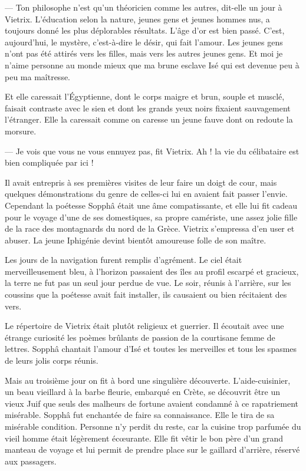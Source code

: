 \documentclass[a4paper, 11pt, oneside, polutonikogreek, french]{article}
\begin{document}
--- Ton philosophe n'est qu'un théoricien comme les autres, dit-elle un jour à Vietrix. L'éducation selon la nature, jeunes gens et jeunes hommes nus, a toujours donné les plus déplorables résultats. L'âge d'or est bien passé. C'est, aujourd'hui, le mystère, c'est-à-dire le désir, qui fait l'amour. Les jeunes gens n'ont pas été attirés vers les filles, mais vers les autres jeunes gens. Et moi je n'aime personne au monde mieux que ma brune esclave Isé qui est devenue peu à peu ma maîtresse.

Et elle caressait l'Égyptienne, dont le corps maigre et brun, souple et musclé, faisait contraste avec le sien et dont les grands yeux noirs fixaient sauvagement l'étranger. Elle la caressait comme on caresse un jeune fauve dont on redoute la morsure.

--- Je vois que vous ne vous ennuyez pas, fit Vietrix. Ah ! la vie du célibataire est bien compliquée par ici !

Il avait entrepris à ses premières visites de leur faire un doigt de cour, mais quelques démonstrations du genre de celles-ci lui en avaient fait passer l'envie. Cependant la poétesse Sopphâ était une âme compatissante, et elle lui fit cadeau pour le voyage d'une de ses domestiques, sa propre camériste, une assez jolie fille de la race des montagnards du nord de la Grèce. Vietrix s'empressa d'en user et abuser. La jeune Iphigénie devint bientôt amoureuse folle de son maître.

\bigskip
\centerline{\EightStarTaper}
\centerline{\EightStarTaper\EightStarTaper}
\bigskip

Les jours de la navigation furent remplis d'agrément. Le ciel était merveilleusement bleu, à l'horizon passaient des îles au profil escarpé et gracieux, la terre ne fut pas un seul jour perdue de vue. Le soir, réunis à l'arrière, sur les coussins que la poétesse avait fait installer, ils causaient ou bien récitaient des vers.

Le répertoire de Vietrix était plutôt religieux et guerrier. Il écoutait avec une étrange curiosité les poèmes brûlants de passion de la courtisane femme de lettres. Sopphâ chantait l'amour d'Isé et toutes les merveilles et tous les spasmes de leurs jolis corps réunis.

\bigskip
\centerline{\EightStarTaper}
\centerline{\EightStarTaper\EightStarTaper}
\bigskip

Mais au troisième jour on fit à bord une singulière découverte. L'aide-cuisinier, un beau vieillard à la barbe fleurie, embarqué en Crète, se découvrit être un vieux Juif que seuls des malheurs de fortune avaient condamné à ce rapatriement misérable. Sopphâ fut enchantée de faire sa connaissance. Elle le tira de sa misérable condition. Personne n'y perdit du reste, car la cuisine trop parfumée du vieil homme était légèrement écœurante. Elle fit vêtir le bon père d'un grand manteau de voyage et lui permit de prendre place sur le gaillard d'arrière, réservé aux passagers.
\end{document}
